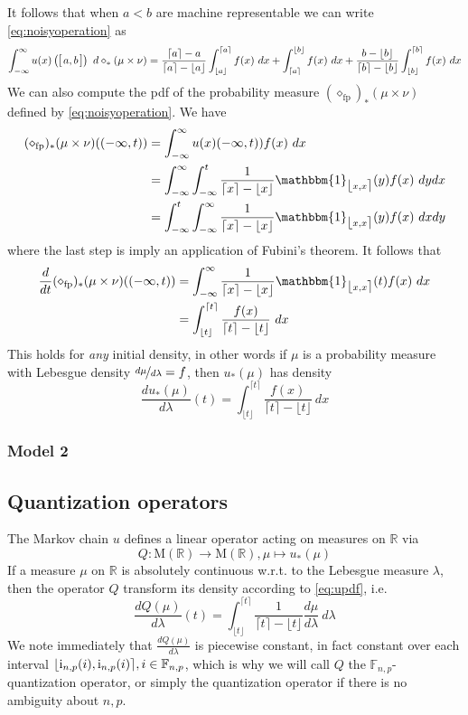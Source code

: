 \documentclass[10pt,a4paper]{article}
\theoremstyle{plain}
\theoremstyle{definition}
\newcommand{\F}[1][n,p]{\mathbb{F}_{#1}}
\newcommand{\R}{\mathbb{R}}
\newcommand{\Rep}[1][n,p]{\mathrm{i}_{#1}}
\newcommand{\one}{\mathbbm{1}}
\newcommand{\Mes}{\mathrm{M}}
\newcommand{\ceil}[1]{\lceil #1 \rceil}
\newcommand{\floor}[1]{\lfloor #1 \rfloor}
\newcommand{\intvl}[1]{\mathlarger{\left[\right.}  #1 \mathlarger{\left.\right]}}
\newcommand{\fintvl}[1][x]{\mathlarger{\lfloor}#1,#1\mathlarger{\rceil}}
\newcommand{\fp}{_{\mathrm{fp}}}
\begin{document}
\noindent It follows that when $a<b$ are machine representable we can write \eqref{eq:noisyoperation} as
\begin{align*}
\int_{-\infty}^{\infty} u(x)\left(\intvl{a,b}\right) ~d\diamond_\ast(\mu\times \nu)=\frac{\ceil{a}-a}{\ceil{a}-\floor{a}}\int_{\floor{a}}^{\ceil{a}}  f(x) ~dx + \int_{\ceil{a}}^{\floor{b}} f(x)~dx +
\frac{b-\floor{b}}{\ceil{b}-\floor{b}}\int_{\floor{b}}^{\ceil{b}}  f(x) ~dx
\end{align*}
We can also compute the pdf of the probability measure $(\diamond\fp)_\ast(\mu\times \nu)$ defined by \eqref{eq:noisyoperation}. We have
\begin{align*}
(\diamond\fp)_\ast(\mu\times \nu)((-\infty,t))&=\int_{-\infty}^\infty u(x)(-\infty,t))f(x) ~dx\\
&=\int_{-\infty}^\infty \int_{-\infty}^t \frac{1}{\ceil{x}-\floor{x}} \one_{\fintvl}(y) f(x) ~dy dx\\
&=\int_{-\infty}^t\int_{-\infty}^\infty\frac{1}{\ceil{x}-\floor{x}} \one_{\fintvl}(y) f(x) ~dx dy
\end{align*}
where the last step is imply an application of Fubini's theorem. It follows that
\begin{align*}
\frac{d}{dt}(\diamond\fp)_\ast(\mu\times \nu)((-\infty,t))&=\int_{-\infty}^\infty\frac{1}{\ceil{x}-\floor{x}} \one_{\fintvl}(t) f(x) ~dx\\
&=\int_{\floor{t}}^{\ceil{t}}\frac{f(x)}{\ceil{t}-\floor{t}} ~dx
\end{align*}
This holds for \emph{any} initial density, in other words if $\mu$ is a probability measure with Lebesgue density $\nicefrac{d\mu}{d\lambda}=f$, then $u_\ast(\mu)$ has density
\begin{equation}
\frac{du_\ast(\mu)}{d\lambda}(t)=\int_{\floor{t}}^{\ceil{t}}\frac{f(x)}{\ceil{t}-\floor{t}} ~dx \label{eq:updf}
\end{equation}

\subsubsection{Model 2}

\subsection{Quantization operators }



The Markov chain $u$ defines a linear operator acting on measures on $\R$ via 
\[
Q: \Mes(\R)\to\Mes(\R), \mu\mapsto u_\ast(\mu)
\]
If a measure $\mu$ on $\R$ is absolutely continuous w.r.t. to the Lebesgue measure $\lambda$, then the operator $Q$ transform its density according to \eqref{eq:updf}, i.e.
\[
\frac{dQ(\mu)}{d\lambda}(t)=\int_{\floor{t}}^{\ceil{t}} \frac{1}{\ceil{t}-\floor{t}} \frac{d\mu}{d\lambda}~d\lambda 
\] 
We note immediately that $\frac{dQ(\mu)}{d\lambda}$ is piecewise constant, in fact constant over each interval $\fintvl[\Rep(i)], i\in \F$, which is why we will call $Q$ the $\F$-quantization operator, or simply the quantization operator if there is no ambiguity about $n,p$.
\end{document}
